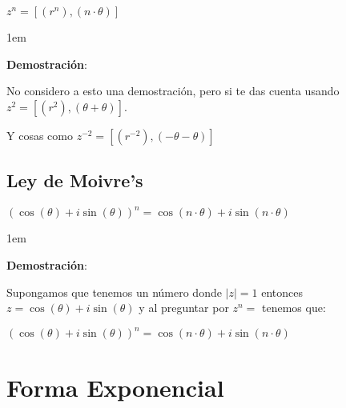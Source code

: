 \documentclass[12pt, fleqn]{report}                             %
\newenvironment{SmallIndentation}[1][0.75em]                    %
    {\begin{adjustwidth}{#1}{}\begin{footnotesize}}                 %
    {\end{footnotesize}\end{adjustwidth}}                           %
\newcommand{\Wrap}[1]{\left( #1 \right)}                        %
\newcommand{\Cos}[1]{\cos\Wrap{#1}}
\newcommand{\Sin}[1]{\sin\Wrap{#1}}
\begin{document}
\begin{itemize}
                    $z^n = [(r^n), (n \cdot \theta)]$

                    \begin{SmallIndentation}[1em]
                        \textbf{Demostración}:

                        No considero a esto una demostración, pero si te das cuenta usando
                        $z^2 = [(r^2), (\theta + \theta)]$.

                        Y cosas como $z^{-2} = [(r^{-2}), (-\theta -\theta)]$
                        
                    \end{SmallIndentation}

            \end{itemize}


        \clearpage
        \section{Ley de Moivre's}

            $(\Cos{\theta}+i\Sin{\theta})^n = \Cos{n \cdot \theta} + i \Sin{n \cdot \theta}$
            
            \begin{SmallIndentation}[1em]
                \textbf{Demostración}:

                Supongamos que tenemos un número donde $|z|=1$ entonces $z= \Cos{\theta}+i\Sin{\theta}$
                y al preguntar por $z^n = $ tenemos que:

                $(\Cos{\theta}+i\Sin{\theta})^n = \Cos{n \cdot \theta} + i \Sin{n \cdot \theta}$
                
            \end{SmallIndentation}



    \chapter{Forma Exponencial}
\end{document}

